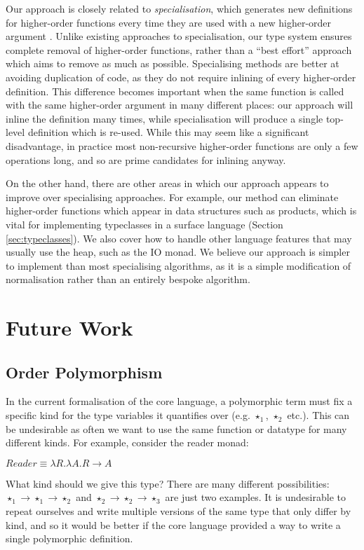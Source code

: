 \documentclass[runningheads]{llncs}
\begin{document}
Our approach is closely related to \emph{specialisation}, which generates new definitions for higher-order functions every time they are used with a new higher-order argument \cite{chin1996higher}. Unlike existing approaches to specialisation, our type system ensures complete removal of higher-order functions, rather than a ``best effort'' approach which aims to remove as much as possible. Specialising methods are better at avoiding duplication of code, as they do not require inlining of every higher-order definition. This difference becomes important when the same function is called with the same higher-order argument in many different places: our approach will inline the definition many times, while specialisation will produce a single top-level definition which is re-used. While this may seem like a significant disadvantage, in practice most non-recursive higher-order functions are only a few operations long, and so are prime candidates for inlining anyway.

On the other hand, there are other areas in which our approach appears to improve over specialising approaches. For example, our method can eliminate higher-order functions which appear in data structures such as products, which is vital for implementing typeclasses in a surface language (Section \ref{sec:typeclasses}). We also cover how to handle other language features that may usually use the heap, such as the IO monad. We believe our approach is simpler to implement than most specialising algorithms, as it is a simple modification of normalisation rather than an entirely bespoke algorithm.
\section{Future Work}

\subsection{Order Polymorphism} \label{sec:order-polymorphism}

In the current formalisation of the core language, a polymorphic term must fix a specific kind for the type variables it quantifies over (e.g. $\star_1$, $\star_2$ etc.). This can be undesirable as often we want to use the same function or datatype for many different kinds. For example, consider the reader monad:

$Reader \equiv \lambda R. \lambda A. R \rightarrow A$

What kind should we give this type? There are many different possibilities: $\star_1 \rightarrow \star_1 \rightarrow \star_2$ and $\star_2 \rightarrow \star_2 \rightarrow \star_3$ are just two examples. It is undesirable to repeat ourselves and write multiple versions of the same type that only differ by kind, and so it would be better if the core language provided a way to write a single polymorphic definition.
\end{document}
